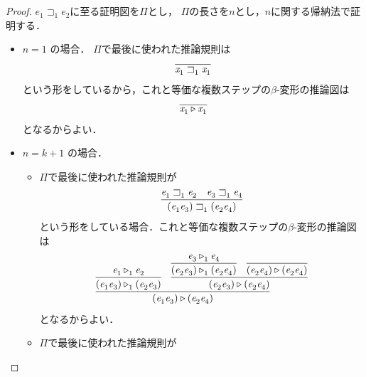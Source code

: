 \documentclass{ltjsbook}%
\begin{document}
\begin{proof}%
  $\mathit{e}_1^{}\sqsupset_1^{}\mathit{e}_2^{}$に至る証明図を$\Pi$とし，%
  $\Pi$の長さを$n$とし，$n$に関する帰納法で証明する．%
  \begin{itemize}%
  \item $n=1$ の場合．%
    $\Pi$で最後に使われた推論規則は%
    \begin{equation}%
      \infer{%
        \mathit{x}_1^{}\sqsupset_1^{}\mathit{x}_1^{}%
      }{%
      }%
    \end{equation}%
    という形をしているから，これと等価な複数ステップの$\beta$-変形の推論図は%
    \begin{equation}%
      \infer{%
        \mathit{x}_1^{}\triangleright\mathit{x}_1^{}%
      }{%
      }%
    \end{equation}%
    となるからよい．%
  \item $n=k + 1$ の場合．%
    \begin{itemize}%
    \item$\Pi$で最後に使われた推論規則が%
    \begin{equation}%
      \infer{%
        (\mathit{e}_1^{}\mathit{e}_3^{})\sqsupset_1^{}(\mathit{e}_2^{}\mathit{e}_4^{})%
      }{%
        \mathit{e}_1^{}\sqsupset_1^{}\mathit{e}_2^{}%
      &%
        \mathit{e}_3^{}\sqsupset_1^{}\mathit{e}_4^{}%
      }%
    \end{equation}%
    という形をしている場合．これと等価な複数ステップの$\beta$-変形の推論図は%
    \begin{equation}%
      \infer{%
        (\mathit{e}_1^{}\mathit{e}_3^{})\triangleright(\mathit{e}_2^{}\mathit{e}_4^{})%
      }{%
        \infer{%
          (\mathit{e}_1^{}\mathit{e}_3^{})\triangleright_1^{}(\mathit{e}_2^{}\mathit{e}_3^{})%
        }{%
          \mathit{e}_1^{}\triangleright_1^{}\mathit{e}_2^{}%
        }%
      &%
        \infer{%
          (\mathit{e}_2^{}\mathit{e}_3^{})\triangleright(\mathit{e}_2^{}\mathit{e}_4^{})%
        }{%
          \infer{%
            (\mathit{e}_2^{}\mathit{e}_3^{})\triangleright_1^{}(\mathit{e}_2^{}\mathit{e}_4^{})%
          }{%
            \mathit{e}_3^{}\triangleright_1^{}\mathit{e}_4^{}%
          }%
        &%
          \infer{%
            (\mathit{e}_2^{}\mathit{e}_4^{})\triangleright(\mathit{e}_2^{}\mathit{e}_4^{})%
          }{}%
        }%
      }%
    \end{equation}%
    となるからよい．%
    \item$\Pi$で最後に使われた推論規則が%
    \begin{equation}%

\end{equation}
\end{itemize}
\end{itemize}
\end{proof}
\end{document}
